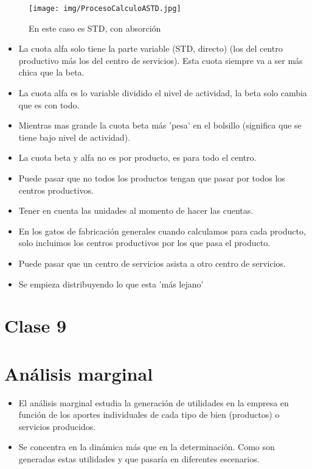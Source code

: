\documentclass[titlepage,a4paper]{article}
\begin{document}
\begin{figure}[!htb]
    \centering
    \texttt{[image: img/ProcesoCalculoASTD.jpg]}
    \caption{En este caso es STD, con absorción}
\end{figure}

\begin{itemize}
\item La cuota alfa solo tiene la parte variable (STD, directo) (los del centro productivo más los del centro de servicios). Esta cuota siempre va a ser más chica que la beta.
\item La cuota alfa es lo variable dividido el nivel de actividad, la beta solo cambia que es con todo.
\item Mientras mas grande la cuota beta más 'pesa' en el bolsillo (significa que se tiene bajo nivel de actividad).
\item La cuota beta y alfa  no es por producto, es para todo el centro.
\item Puede pasar que no todos los productos tengan que pasar por todos los centros productivos.
\item Tener en cuenta las unidades al momento de hacer las cuentas.
\item En los gatos de fabricación generales cuando calculamos para cada producto, solo incluimos los centros productivos por los que pasa el producto.
\item Puede pasar que un centro de servicios asista a otro centro de servicios.
\item Se empieza distribuyendo lo que esta 'más lejano'
\end{itemize}





\newpage
\section*{Clase 9}

\section{Análisis marginal}


\begin{itemize}
\item El análisis marginal estudia la generación de utilidades en la empresa en función de los aportes individuales de cada tipo de bien (productos) o servicios producidos.
\item Se concentra en la dinámica más que en la determinación. Como son generadas estas utilidades y que pasaría en diferentes escenarios.
\end{itemize}
\end{document}
